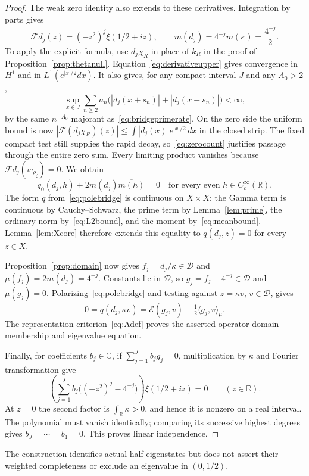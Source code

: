 \documentclass[11pt,a4paper]{article}
\numberwithin{equation}{section}
\theoremstyle{definition}
\theoremstyle{remark}
\newcommand{\R}{\mathbb R}
\newcommand{\C}{\mathbb C}
\newcommand{\E}{\mathcal E}
\newcommand{\D}{\mathcal D}
\newcommand{\ip}[2]{\langle #1,#2\rangle}
\begin{document}
\begin{proof}
The weak zero identity also extends to these derivatives. Integration by parts gives
\[
 \mathcal Fd_j(z)=(-z^2)^j\xi(1/2+iz),\qquad
 m(d_j)=4^{-j}m(\kappa)=\frac{4^{-j}}2.
\]
To apply the explicit formula, use $d_j\chi_R$ in place of $k_R$ in the proof of Proposition~\ref{prop:thetanull}. Equation~\eqref{eq:derivativeupper} gives convergence in $H^1$ and in $L^1(e^{|x|/2}dx)$. It also gives, for any compact interval $J$ and any $A_0>2$,
\[
 \sup_{x\in J}\sum_{n\ge2}a_n
       \bigl(|d_j(x+s_n)|+|d_j(x-s_n)|\bigr)<\infty,
\]
by the same $n^{-A_0}$ majorant as~\eqref{eq:bridgeprimerate}. On the zero side the uniform bound is now
$|\mathcal F(d_j\chi_R)(z)|\le\int|d_j(x)|e^{|x|/2}\,dx$
in the closed strip. The fixed compact test still supplies the rapid decay, so~\eqref{eq:zerocount} justifies passage through the entire zero sum. Every limiting product vanishes because $\mathcal Fd_j(w_{\rho_\zeta})=0$. We obtain
\[
 q_0(d_j,h)+2m(d_j)\overline{m(h)}=0
 \quad\text{for every even }h\in C_c^\infty(\R).
\]
The form $q$ from~\eqref{eq:polebridge} is continuous on $X\times X$: the Gamma term is continuous by Cauchy--Schwarz, the prime term by Lemma~\ref{lem:prime}, the ordinary norm by~\eqref{eq:L2bound}, and the moment by~\eqref{eq:meanbound}. Lemma~\ref{lem:Xcore} therefore extends this equality to $q(d_j,z)=0$ for every $z\in X$.

Proposition~\ref{prop:domain} now gives $f_j=d_j/\kappa\in\D$ and $\mu(f_j)=2m(d_j)=4^{-j}$. Constants lie in $\D$, so $g_j=f_j-4^{-j}\in\D$ and $\mu(g_j)=0$. Polarizing~\eqref{eq:polebridge} and testing against $z=\kappa v$, $v\in\D$, gives
\[
 0=q(d_j,\kappa v)
   =\E(g_j,v)-\tfrac12\ip{g_j}{v}_\mu.
\]
The representation criterion~\eqref{eq:Adef} proves the asserted operator-domain membership and eigenvalue equation.

Finally, for coefficients $b_j\in\C$, if $\sum_{j=1}^Jb_jg_j=0$, multiplication by $\kappa$ and Fourier transformation give
\[
 \left(\sum_{j=1}^Jb_j\bigl((-z^2)^j-4^{-j}\bigr)\right)
       \xi(1/2+iz)=0\qquad(z\in\R).
\]
At $z=0$ the second factor is $\int_\R\kappa>0$, and hence it is nonzero on a real interval. The polynomial must vanish identically; comparing its successive highest degrees gives $b_J=\cdots=b_1=0$. This proves linear independence.
\end{proof}

The construction identifies actual half-eigenstates but does not assert their weighted completeness or exclude an eigenvalue in $(0,1/2)$.
\end{document}

